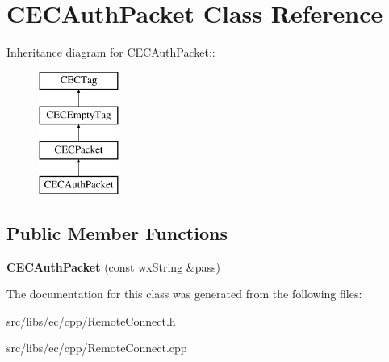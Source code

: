 \section{CECAuthPacket Class Reference}
\label{classCECAuthPacket}
Inheritance diagram for CECAuthPacket::\begin{figure}[H]
\begin{center}
\leavevmode
\includegraphics[height=4cm]{classCECAuthPacket}
\end{center}
\end{figure}
\subsection*{Public Member Functions}
\begin{DoxyCompactItemize}
\item 
{\bfseries CECAuthPacket} (const wxString \&pass)\label{classCECAuthPacket_adc8910f77e80f9b09de2c383bef1da10}

\end{DoxyCompactItemize}


The documentation for this class was generated from the following files:\begin{DoxyCompactItemize}
\item 
src/libs/ec/cpp/RemoteConnect.h\item 
src/libs/ec/cpp/RemoteConnect.cpp\end{DoxyCompactItemize}
